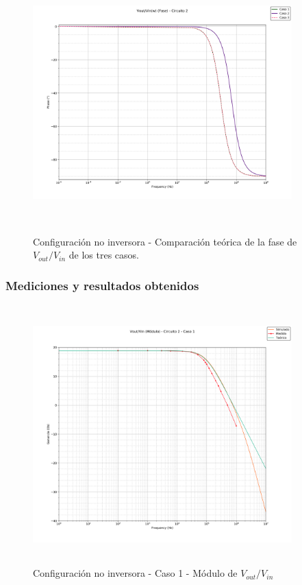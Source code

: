 \begin{figure}[H] %
\centering
\includegraphics[width=10cm,height=10cm,keepaspectratio]{../EJ1/00GRAFICOS/teoricos/circ2vovifasew.png}
\caption{Configuración no inversora - Comparaci\'on te\'orica de la fase de $V_{out}/V_{in}$ de los tres casos.}
\label{c2voviTeoPh}
\end{figure}

\subsubsection*{Mediciones y resultados obtenidos} %

\begin{figure}[H] %
	\centering
	\includegraphics[width=10cm,height=10cm,keepaspectratio]{../EJ1/00GRAFICOS/c2c1/c2c1voviMod.png}
	\caption{Configuración no inversora - Caso 1 -  M\'odulo de $V_{out}/V_{in}$}
	\label{c2c1voviM}
\end{figure}

